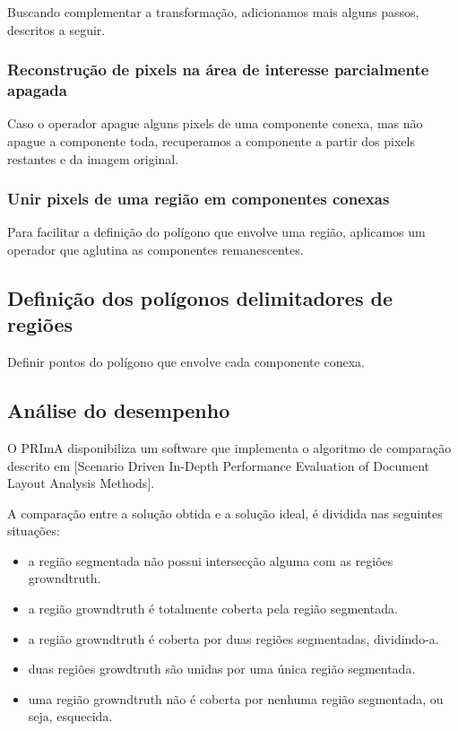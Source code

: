 \documentclass[a4paper,11pt]{article}
\begin{document}
      Buscando complementar a transformação, adicionamos mais alguns passos, descritos a seguir.

      \subsubsection{Reconstrução de pixels na área de interesse parcialmente apagada}

        Caso o operador apague alguns pixels de uma componente conexa, mas não apague a componente toda, recuperamos a componente a partir dos pixels restantes e da imagem original.

      \subsubsection{Unir pixels de uma região em componentes conexas}

        Para facilitar a definição do polígono que envolve uma região, aplicamos um operador que aglutina as componentes remanescentes.

    \subsection{Definição dos polígonos delimitadores de regiões}

      Definir pontos do polígono que envolve cada componente conexa.

    \subsection{Análise do desempenho}

      O PRImA disponibiliza um software que implementa o algoritmo de comparação descrito em [Scenario Driven In-Depth Performance Evaluation of Document Layout Analysis Methods].

      A comparação entre a solução obtida e a solução ideal, é dividida nas seguintes situações:

      \begin{itemize}
        \item a região segmentada não possui intersecção alguma com as regiões growndtruth.
        \item a região growndtruth é totalmente coberta pela região segmentada.
        \item a região growndtruth é coberta por duas regiões segmentadas, dividindo-a.
        \item duas regiões growdtruth são unidas por uma única região segmentada.
        \item uma região growndtruth não é coberta por nenhuma região segmentada, ou seja, esquecida.
      \end{itemize}
\end{document}
